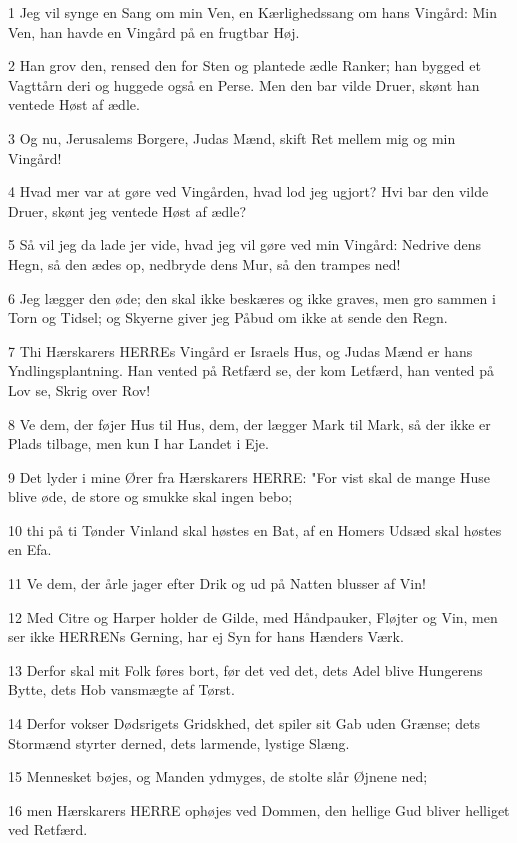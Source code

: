 \par 1 Jeg vil synge en Sang om min Ven, en Kærlighedssang om hans Vingård: Min Ven, han havde en Vingård på en frugtbar Høj.
\par 2 Han grov den, rensed den for Sten og plantede ædle Ranker; han bygged et Vagttårn deri og huggede også en Perse. Men den bar vilde Druer, skønt han ventede Høst af ædle.
\par 3 Og nu, Jerusalems Borgere, Judas Mænd, skift Ret mellem mig og min Vingård!
\par 4 Hvad mer var at gøre ved Vingården, hvad lod jeg ugjort? Hvi bar den vilde Druer, skønt jeg ventede Høst af ædle?
\par 5 Så vil jeg da lade jer vide, hvad jeg vil gøre ved min Vingård: Nedrive dens Hegn, så den ædes op, nedbryde dens Mur, så den trampes ned!
\par 6 Jeg lægger den øde; den skal ikke beskæres og ikke graves, men gro sammen i Torn og Tidsel; og Skyerne giver jeg Påbud om ikke at sende den Regn.
\par 7 Thi Hærskarers HERREs Vingård er Israels Hus, og Judas Mænd er hans Yndlingsplantning. Han vented på Retfærd se, der kom Letfærd, han vented på Lov se, Skrig over Rov!
\par 8 Ve dem, der føjer Hus til Hus, dem, der lægger Mark til Mark, så der ikke er Plads tilbage, men kun I har Landet i Eje.
\par 9 Det lyder i mine Ører fra Hærskarers HERRE: "For vist skal de mange Huse blive øde, de store og smukke skal ingen bebo;
\par 10 thi på ti Tønder Vinland skal høstes en Bat, af en Homers Udsæd skal høstes en Efa.
\par 11 Ve dem, der årle jager efter Drik og ud på Natten blusser af Vin!
\par 12 Med Citre og Harper holder de Gilde, med Håndpauker, Fløjter og Vin, men ser ikke HERRENs Gerning, har ej Syn for hans Hænders Værk.
\par 13 Derfor skal mit Folk føres bort, før det ved det, dets Adel blive Hungerens Bytte, dets Hob vansmægte af Tørst.
\par 14 Derfor vokser Dødsrigets Gridskhed, det spiler sit Gab uden Grænse; dets Stormænd styrter derned, dets larmende, lystige Slæng.
\par 15 Mennesket bøjes, og Manden ydmyges, de stolte slår Øjnene ned;
\par 16 men Hærskarers HERRE ophøjes ved Dommen, den hellige Gud bliver helliget ved Retfærd.
